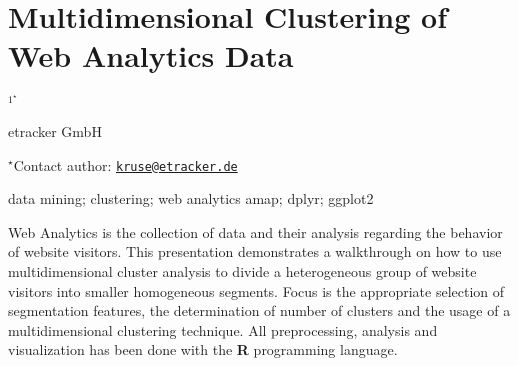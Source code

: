 \documentclass[\main/boa.tex]{subfiles}
\begin{document}
\section{Multidimensional Clustering of Web Analytics Data}

\begin{center}
  {\bf {}$^{1^\star}$}
\end{center}

\vskip 0.3cm

\begin{affiliations}
\begin{enumerate}
\begin{minipage}{0.915\textwidth}
\centering
\item etracker GmbH \\[-2pt]
\end{minipage}
\end{enumerate}
$^\star$Contact author: \href{mailto:kruse@etracker.de}{\nolinkurl{kruse@etracker.de}}\\
\end{affiliations}

\vskip 0.5cm

\begin{minipage}{0.915\textwidth}
\keywords data mining; clustering; web analytics
\packages amap; dplyr; ggplot2
\end{minipage}

\vskip 0.8cm

Web Analytics is the collection of data and their analysis regarding the
behavior of website visitors. This presentation demonstrates a
walkthrough on how to use multidimensional cluster analysis to divide a
heterogeneous group of website visitors into smaller homogeneous
segments. Focus is the appropriate selection of segmentation features,
the determination of number of clusters and the usage of a
multidimensional clustering technique. All preprocessing, analysis and
visualization has been done with the \textbf{R} programming language.
\end{document}
